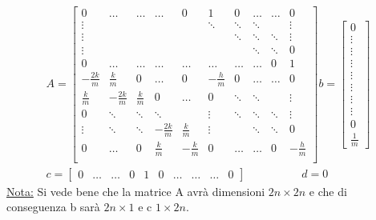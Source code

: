\documentclass[a4paper]{report}
\begin{document}
\begin{align*}
A=\begin{bmatrix}
0 & \dotsc  & \dotsc  & \dotsc  & 0 & 1 & 0 & \dotsc  & \dotsc  & 0\\
\vdots  &  &  &  &  & \ddots  & \ddots  & \ddots  &  & \vdots \\
\vdots  &  &  &  &  &  & \ddots  & \ddots  & \ddots  & \vdots \\
\vdots  &  &  &  &  &  &  & \ddots  & \ddots  & 0\\
0 & \dotsc  & \dotsc  & \dotsc  & \dotsc  & \dotsc  & \dotsc  & \dotsc  & 0 & 1\\
-\frac{2k}{m} & \frac{k}{m} & 0 & \dotsc  & 0 & -\frac{h}{m} & 0 & \dotsc  & \dotsc  & 0\\
\frac{k}{m} & -\frac{2k}{m} & \frac{k}{m} & 0 & \dotsc  & 0 & \ddots  & \ddots  &  & \vdots \\
0 & \ddots  & \ddots  & \ddots  &  & \vdots  & \ddots  & \ddots  & \ddots  & \vdots \\
\vdots  & \ddots  & \ddots  & -\frac{2k}{m} & \frac{k}{m} & \vdots  &  & \ddots  & \ddots  & 0\\
0 & \dotsc  & 0 & \frac{k}{m} & -\frac{k}{m} & 0 & \dotsc  & \dotsc  & 0 & -\frac{h}{m}\\
\end{bmatrix} b=\begin{bmatrix}
0\\
\vdots\\
\vdots\\
\vdots\\
\vdots\\
\vdots\\
\vdots\\
\vdots\\
0\\
\frac{1}{m}
\end{bmatrix}\\
c=\begin{bmatrix}
0&\dots&\dots&0&1&0&\dots&\dots&\dots&0
\end{bmatrix}\quad \quad\quad\quad \quad d=0
\end{align*}
\underline{Nota:} Si vede bene che la matrice A avrà dimensioni $2n\times 2n$ e che di conseguenza b sarà $2n\times 1$ e c $1\times 2n$.
\end{document}
